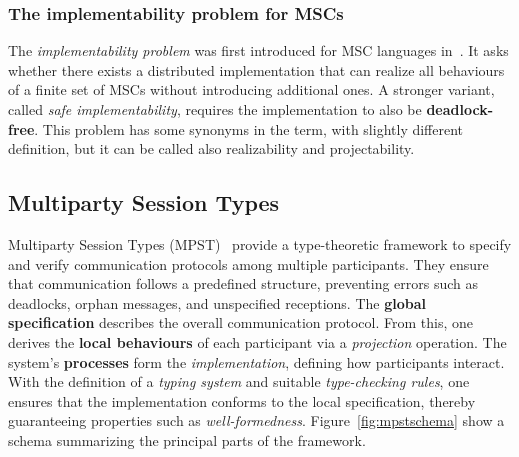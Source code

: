 
\subsubsection{The implementability problem for MSCs}

The \emph{implementability problem} was first introduced for MSC languages 
in~\cite{alur2000inference,alur2003inference}. It asks whether there exists a distributed 
implementation that can realize all behaviours of a finite set of MSCs 
without introducing additional ones. A stronger variant, called 
\emph{safe implementability}, requires the implementation to also be \textbf{deadlock-free}. 
This problem has some synonyms in the term, with slightly different definition,
but it can be called also realizability and projectability.


\subsection{Multiparty Session Types}
Multiparty Session Types (MPST)~\cite{honda2008multiparty} 
provide a type-theoretic framework to specify and verify communication 
protocols among multiple participants. They ensure that communication 
follows a predefined structure, preventing errors such as deadlocks, 
orphan messages, and unspecified receptions. The 
\textbf{global specification} describes the overall communication 
protocol. From this, one derives the \textbf{local behaviours} of each 
participant via a \emph{projection} operation. The system's 
\textbf{processes} form the \emph{implementation}, defining how 
participants interact. With the definition of a \emph{typing system} 
and suitable \emph{type-checking rules}, one ensures that the 
implementation conforms to the local specification, thereby 
guaranteeing properties such as \emph{well-formedness}.  
Figure~\ref{fig:mpstschema} show a schema summarizing the principal
parts of the framework.

